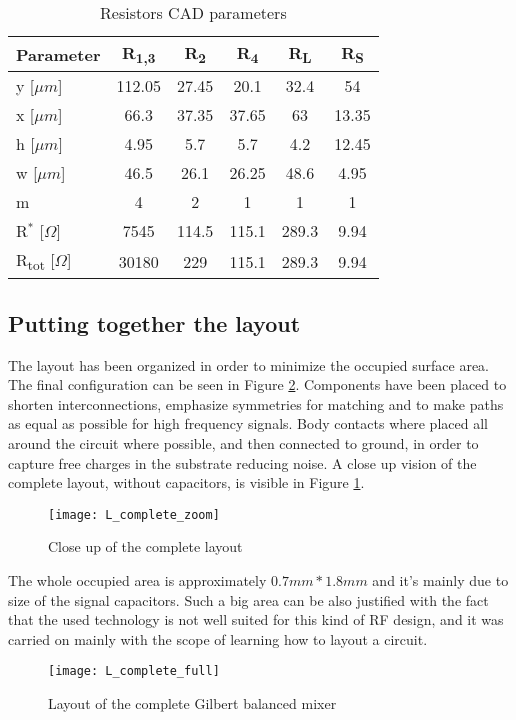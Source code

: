 \begin{table} [h]
	\label{tab:specs}
	\caption{Resistors CAD parameters}
	\centering	
	\begin{tabular}{lccccc} 
		\toprule 
		Parameter & R\textsubscript{1,3}& R\textsubscript{2} & R\textsubscript{4}&R\textsubscript{L}&R\textsubscript{S} \\ 
		\midrule
		y [$\mu m$] &112.05&27.45&20.1&32.4&54\\
		x [$\mu m$] &66.3&37.35&37.65&63&13.35\\
		h [$\mu m$] &4.95&5.7&5.7&4.2&12.45\\
		w [$\mu m$] &46.5&26.1&26.25&48.6&4.95\\
		m			&4&2&1&1&1\\
		R$^*$ [$\Omega$] & 7545&114.5&115.1&289.3&9.94\\
		R\textsubscript{tot} [$\Omega$]&30180&229&115.1&289.3&9.94\\
		\bottomrule 
	\end{tabular}	
\end{table}
 \newpage
\subsection{Putting together the layout}
The layout has been organized in order to minimize the occupied surface area. The final configuration can be seen in Figure \ref{L_complete_full}. 
Components have been placed to shorten interconnections, emphasize symmetries for matching and to make paths as equal as possible for high frequency signals.
Body contacts where placed all around the circuit where possible, and then connected to ground, in order to capture free charges in the substrate reducing noise. A close up vision of the complete layout, without capacitors, is visible in Figure \ref{L_complete_zoom}.

\begin{figure}[H]
	\centering
	\texttt{[image: L\_complete\_zoom]}
	\caption{Close up of the complete layout}
	\label{L_complete_zoom}
\end{figure}

The whole occupied area is approximately \(0.7mm*1.8mm\) and it's mainly due to size of the signal capacitors. Such a big area can be also justified with the fact that the used technology is not well suited for this kind of RF design, and it was carried on mainly with the scope of learning how to layout a circuit.

\begin{figure}[H]
	\centering %
	\texttt{[image: L\_complete\_full]}
	\caption{Layout of the complete Gilbert balanced mixer}
	\label{L_complete_full}
\end{figure}
